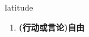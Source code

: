 
\begin{frame}
{\huge latitude}
\begin{center}
\begin{enumerate}\Large
  \item \textbf{(行动或言论)自由}
\end{enumerate}
\end{center}
\end{frame}
